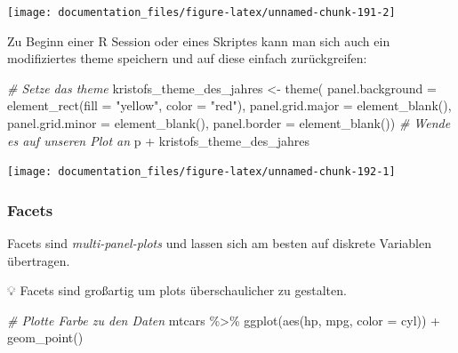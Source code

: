 \documentclass[
]{article}
\newenvironment{Shaded}{\begin{snugshade}}{\end{snugshade}}
\newcommand{\AttributeTok}[1]{\textcolor[rgb]{0.77,0.63,0.00}{#1}}
\newcommand{\CommentTok}[1]{\textcolor[rgb]{0.56,0.35,0.01}{\textit{#1}}}
\newcommand{\FunctionTok}[1]{\textcolor[rgb]{0.00,0.00,0.00}{#1}}
\newcommand{\NormalTok}[1]{#1}
\newcommand{\OtherTok}[1]{\textcolor[rgb]{0.56,0.35,0.01}{#1}}
\newcommand{\SpecialCharTok}[1]{\textcolor[rgb]{0.00,0.00,0.00}{#1}}
\newcommand{\StringTok}[1]{\textcolor[rgb]{0.31,0.60,0.02}{#1}}
\begin{document}
\begin{center}\texttt{[image: documentation\_files/figure-latex/unnamed-chunk-191-2]} \end{center}

Zu Beginn einer R Session oder eines Skriptes kann man sich auch ein modifiziertes theme speichern und auf diese einfach zurückgreifen:

\begin{Shaded}
\begin{Highlighting}[]
\CommentTok{\# Setze das theme}
\NormalTok{kristofs\_theme\_des\_jahres }\OtherTok{\textless{}{-}} \FunctionTok{theme}\NormalTok{(}
  \AttributeTok{panel.background =} \FunctionTok{element\_rect}\NormalTok{(}\AttributeTok{fill =} \StringTok{"yellow"}\NormalTok{, }\AttributeTok{color =} \StringTok{"red"}\NormalTok{),}
  \AttributeTok{panel.grid.major =} \FunctionTok{element\_blank}\NormalTok{(), }
  \AttributeTok{panel.grid.minor =} \FunctionTok{element\_blank}\NormalTok{(), }
  \AttributeTok{panel.border =} \FunctionTok{element\_blank}\NormalTok{())}
\CommentTok{\# Wende es auf unseren Plot an}
\NormalTok{p }\SpecialCharTok{+}\NormalTok{ kristofs\_theme\_des\_jahres}
\end{Highlighting}
\end{Shaded}

\begin{center}\texttt{[image: documentation\_files/figure-latex/unnamed-chunk-192-1]} \end{center}

\hypertarget{facets}{%
\subsubsection{Facets}\label{facets}}

Facets sind \emph{multi-panel-plots} und lassen sich am besten auf diskrete Variablen übertragen.

💡 Facets sind großartig um plots überschaulicher zu gestalten.

\begin{Shaded}
\begin{Highlighting}[]
\CommentTok{\# Plotte Farbe zu den Daten}
\NormalTok{mtcars }\SpecialCharTok{\%\textgreater{}\%}
  \FunctionTok{ggplot}\NormalTok{(}\FunctionTok{aes}\NormalTok{(hp, mpg, }\AttributeTok{color =}\NormalTok{ cyl)) }\SpecialCharTok{+}
  \FunctionTok{geom\_point}\NormalTok{()}
\end{Highlighting}
\end{Shaded}
\end{document}
